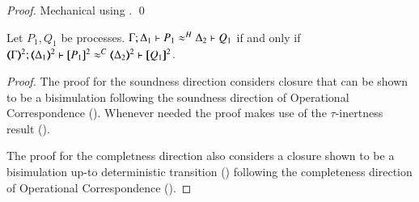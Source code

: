 \else
{\begin{proof} Mechanical using . \qed 
\end{proof}
\fi



\begin{comment}
\begin{proof}[Sketch]
For completeness, we 
consider the \HO process $P = {\bbout{k}{\abs{x} Q} P_1} \Par \binp{k}{X} P_2$. We have that
\[
P \red P_1 \Par P_2 \subst{\abs{x}Q}{X}
\]
In the target language, this reduction is mimicked as follows:
\begin{eqnarray*}
\pmap{P}{2} & = & \newsp{a}{\bout{k}{a} (\pmap{P_1}{3} \Par \repl{} \binp{a}{y} \binp{y}{x} \pmap{Q}{3})\,} 
                  \Par \binp{k}{x} \pmap{P_2}{3} \\
            & \red & \newsp{a}{\pmap{P_1}{3} \Par \repl{} \binp{a}{y} \binp{y}{x} \pmap{Q}{3} 
                  \Par  \pmap{P_2}{3}\subst{a}{x}}
\end{eqnarray*}
\qed
\end{proof}
\end{comment}

\begin{proposition}\myrm
	\label{prop:fulla_HOp_to_p}
	Let $P_1, Q_1$ be \HOp processes.
	$\Gamma; \Delta_1 \vdash P_1 \approx^{H} \Delta_2 \vdash Q_1$
	if and only if
	$\horel{\tmap{\Gamma}{2}}{\tmap{\Delta_1}{2}}{\pmap{P_1}{2}}{\fwb}{\tmap{\Delta_2}{2}}{\pmap{Q_1}{2}}$.
\end{proposition}

\begin{proof}
	The proof for the soundness direction considers
	closure that can be shown to be a bisimulation
	following the soundness direction of Operational Correspondence
	(). Whenever needed
	the proof makes use of the $\tau$-inertness result
	().

	The proof for the completness direction also considers
	a closure shown to be a bisimulation
	up-to deterministic transition ()
	following the completeness direction of Operational Correspondence
	().


\end{proof}}
